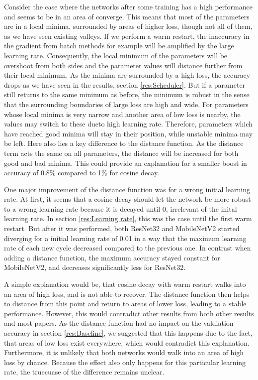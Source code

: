 Consider the case where the networks after some training has a high performance
and seems to be in an area of converge. This means that most of the parameters
are in a local minima, surrounded by areas of higher loss, though not all of
them, as we have seen existing valleys. If we perform a warm restart, the
inaccuracy in the gradient from batch methods for example will be amplified by
the large learning rate. Consequently, the local minimum of the parameters will
be overshoot from both sides and the parameter values will distance further from
their local minimum. As the minima are surrounded by a high loss, the accuracy
drops as we have seen in the results, section \ref{res:Scheduler}. But if a
parameter still returns to the same minimum as before, the minimum is robust in
the sense that the surrounding boundaries of large loss are high and wide. For
parameters whose local minima is very narrow and another area of low loss is
nearby, the values may switch to these dueto high learning rate. Therefore,
parameters which have reached good minima will stay in their position, while
unstable minima may be left. Here also lies a key difference to the distance
function. As the distance term acts the same on all parameters, the distance
will be increased for both good and bad minima. This could provide an
explanation for a smaller boost in accuracy of 0.8\% compared to 1\% for cosine
decay.
\newline

One major improvement of the distance function was for a wrong initial learning
rate. At first, it seems that a cosine decay should let the network be more
robust to a wrong learning rate because it is decayed until 0, irrelevant of the
inital learning rate. In section \ref{res:Learning rate}, this was the case
until the first warm restart. But after it was performed, both ResNet32 and
MobileNetV2 started diverging for a initial learning rate of 0.01 in a way that
the maximum learning rate of each new cycle decreased compared to the previous
one. In contrast when adding a distance function, the maximum accuracy stayed
constant for MobileNetV2, and decreases significantly less for ResNet32.

A simple explanation would be, that cosine decay with warm restart walks into an
area of high loss, and is not able to recover. The distance function then helps
to distance from this point and return to areas of lower loss, leading to a
stable performance. However, this would contradict other results from both other
results and most papers. As the distance function had no impact on the
valdiation accuracy in section \ref{res:Baseline}, we suggested that this
happens due to the fact, that areas of low loss exist everywhere, which would
contradict this explanation. Furthermore, it is unlikely that both networks
would walk into an area of high loss by chance. Because the effect also only
happens for this particular learning rate, the truecuase of the difference
remains unclear.
\newline

